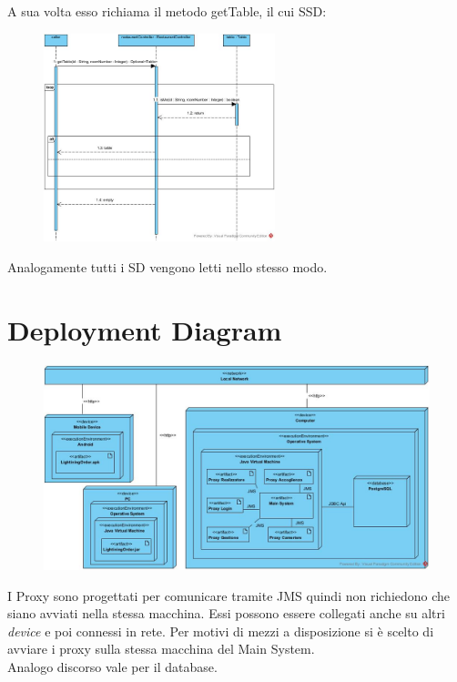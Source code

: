 A sua volta esso richiama il metodo getTable, il cui SSD:
 \begin{figure}[H]
	\centering
	\includegraphics[width=0.6\textwidth]{Immagini/tablesAndOrdersArea_getTable.jpg}
\end{figure}

\vspace{1cm}
Analogamente tutti i SD vengono letti nello stesso modo.


\section{Deployment Diagram}
\begin{figure}[H]
	\centering
	\includegraphics[width=1\textwidth]{Immagini/deploy.jpg}
\end{figure}
I Proxy sono progettati per comunicare tramite JMS quindi non richiedono che siano avviati nella stessa macchina. Essi possono essere collegati anche su altri \textit{device} e poi connessi in rete. Per motivi di mezzi a disposizione si è scelto di avviare i proxy sulla stessa macchina del Main System.
\\Analogo discorso vale per il database.

